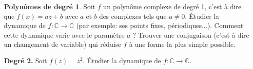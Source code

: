 \documentclass{article}
\begin{document}
\textbf{Polynômes de degré 1}.
Soit $ f $ un polynôme complexe de degré 1,
c'est à dire que
$ f(x) = az + b $
avec $ a $ et $ b $
des complexes tels que
$ a \neq 0 $.
Étudier la dynamique
de
$ f : \mathbb{C} \to \mathbb{C} $
(par exemple: ses points fixes, périodiques...).
Comment cette dynamique varie avec le paramètre
$ a $ ?
Trouver une conjugaison
(c'est à dire un changement de variable)
qui réduise $ f $ à une forme la plus simple
possible.

\textbf{Degré 2.}
Soit $ f(z) = z^{2} $.
Étudier la dynamique
de
$ f : \mathbb{C} \to \mathbb{C} $.

\end{document}
